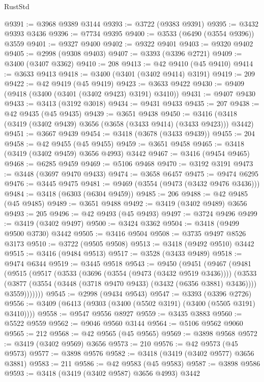 \begin{lexlean}{RustStd}
\begin{coremodule}
@9391 := @3968 @9389 @3144
@9393 := @3722 (@9383 @9391)
@9395 := @3432 @9393 @3436
@9396 := @7734 @9395
@9400 := @3533 (@6490 (@3554 @9396)) @3559
@9401 := @9327 @9400
@9402 := @9322 @9401
@9403 := @9320 @9402
@9405 := @2998 (@9308 @9403)
@9407 := @3393 (@3396 @2721)
@9409 := @3400 (@3407 @3362)
@9410 := 208
@9413 := @42 @9410 (@45 @9410)
@9414 := @3633 @9413
@9418 := @3400 (@3401 (@3402 @9414) @3191)
@9419 := 209
@9422 := @42 @9419 (@45 @9419)
@9423 := @3633 @9422
@9430 := @9409 (@9418 (@3400 (@3401 (@3402 @9423) @3191) @3410))
@9431 := @9407 @9430
@9433 := @3413 (@3192 @3018)
@9434 := @9431 @9433
@9435 := 207
@9438 := @42 @9435 (@45 @9435)
@9439 := @3651 @9438
@9450 := @3416 (@3418 (@3419 (@3402 @9439) @3656 (@3658 (@3433 @9414) (@3433 @9423))) @3442)
@9451 := @3667 @9439
@9454 := @3418 (@3678 (@3433 @9439))
@9455 := 204
@9458 := @42 @9455 (@45 @9455)
@9459 := @3651 @9458
@9465 := @3418 (@3419 (@3402 @9459) @3656 @4993) @3442
@9467 := @3416 (@9454 @9465)
@9468 := @6285 @9459
@9469 := @5106 @9468
@9470 := @3192 @3191
@9473 := @3448 (@3697 @9470 @9433)
@9474 := @3658 @6457
@9475 := @9474 @6295
@9476 := @3445 @9475
@9481 := @9469 (@3554 (@9473 (@3432 @9476 @3436)))
@9484 := @3418 (@6303 (@6304 @9459))
@9485 := 206
@9488 := @42 @9485 (@45 @9485)
@9489 := @3651 @9488
@9492 := @3419 (@3402 @9489) @3656
@9493 := 205
@9496 := @42 @9493 (@45 @9493)
@9497 := @3724 @9496
@9499 := @3419 (@3402 @9497)
@9500 := @3424 @3362
@9504 := @3418 (@9499 @9500 @3730) @3442
@9505 := @3416 @9504
@9508 := @3735 @9497 @8526 @3173
@9510 := @3722 (@9505 @9508)
@9513 := @3418 (@9492 @9510) @3442
@9515 := @3416 (@9484 @9513)
@9517 := @3528 (@3433 @9489)
@9518 := @9474 @6344
@9519 := @3445 @9518
@9543 := @9450
    (@9451
      (@9467
        (@9481
          (@9515
            (@9517
              (@3533
                (@3696 (@3554 (@9473 (@3432 @9519 @3436))))
                (@3533
                  (@3877 (@3554 (@3448 (@3718 @9470 @9433) (@3432 (@6356 @3881) @3436))))
                  @3559)))))))
@9545 := @2998 (@9434 @9543)
@9547 := @3393 (@3396 @2726)
@9556 := @3409 (@6413 (@9303 (@3400 (@5502 @3191) (@3400 (@5505 @3191) @3410))))
@9558 := @9547 @9556 @8927
@9559 := @3435 @3883
@9560 := @5522 @9559
@9562 := @9046 @9560 @3144
@9564 := @5106 @9562 @9060
@9565 := 212
@9568 := @42 @9565 (@45 @9565)
@9569 := @3898 @9568
@9572 := @3419 (@3402 @9569) @3656
@9573 := 210
@9576 := @42 @9573 (@45 @9573)
@9577 := @3898 @9576
@9582 := @3418 (@3419 (@3402 @9577) @3656 @3881)
@9583 := 211
@9586 := @42 @9583 (@45 @9583)
@9587 := @3898 @9586
@9593 := @3418 (@3419 (@3402 @9587) @3656 @4993) @3442

\end{coremodule}
\end{lexlean}
